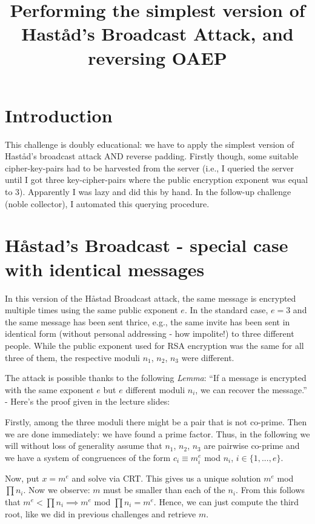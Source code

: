 \documentclass{article}
\title{Performing the simplest version of Hast{\aa}d's Broadcast Attack, and reversing OAEP}
\begin{document}
\maketitle

\section{Introduction}

This challenge is doubly educational: we have to apply the simplest version of Hast{\aa}d's broadcast attack AND reverse padding. Firstly though, some suitable cipher-key-pairs had to be harvested from the server (i.e., I queried the server until I got three key-cipher-pairs where the public encryption exponent was equal to 3). Apparently I was lazy and did this by hand. In the follow-up challenge (noble collector), I automated this querying procedure.

\section{H{\aa}stad's Broadcast - special case with identical messages}

In this version of the H{\aa}stad Broadcast attack, the same message is encrypted multiple times using the same public exponent $e$. In the standard case, $e=3$ and the same message has been sent thrice, e.g., the same invite has been sent in identical form (without personal addressing - how impolite!) to three different people. While the public exponent used for RSA encryption was the same for all three of them, the respective moduli $n_1$, $n_2$, $n_3$ were different.\medskip

The attack is possible thanks to the following \emph{Lemma}: ``If a message is encrypted with the same exponent $e$ but $e$ different moduli $n_i$, we can recover the message.'' - Here's the proof given in the lecture slides:\medskip

Firstly, among the three moduli there might be a pair that is not co-prime. Then we are done immediately: we have found a prime factor. Thus, in the following we will without loss of generality assume that $n_1$, $n_2$, $n_3$ are pairwise co-prime and we have a system of congruences of the form $c_i \equiv m_i^{e}$ mod $n_i$, $i \in \{1,...,e\}$.\medskip

Now, put $x=m^{e}$ and solve via CRT. This gives us a unique solution $m^{e}$ mod $\prod n_i$. Now we observe: $m$ must be smaller than each of the $n_i$. From this follows that $m^{e} < \prod n_i \implies m^{e}$ mod $\prod n_i = m^{e}$. Hence, we can just compute the third root, like we did in previous challenges and retrieve $m$. 
\end{document}
